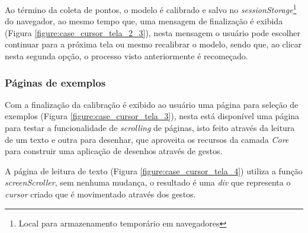 
\par Ao término da coleta de pontos, o modelo é calibrado e salvo no \textit{sessionStorage}\footnote{Local para armazenamento temporário em navegadores} do navegador, ao mesmo tempo que, uma mensagem de finalização é exibida (Figura \ref{figure:case_cursor_tela_2_3}), nesta mensagem o usuário pode escolher continuar para a próxima tela ou mesmo recalibrar o modelo, sendo que, ao clicar nesta segunda opção, o processo visto anteriormente é recomeçado.





\subsubsection{Páginas de exemplos}

\par Com a finalização da calibração é exibido ao usuário uma página para seleção de exemplos (Figura \ref{figure:case_cursor_tela_3}), nesta está disponível uma página para testar a funcionalidade de \textit{scrolling} de páginas, isto feito através da leitura de um texto e outra para desenhar, que aproveita os recursos da camada \textit{Core} para construir uma aplicação de desenhos através de gestos.


\par A página de leitura de texto (Figura \ref{figure:case_cursor_tela_4}) utiliza a função \textit{screenScroller}, sem nenhuma mudança, o resultado é uma \textit{div} que representa o \textit{cursor} criado que é movimentado através dos gestos.


